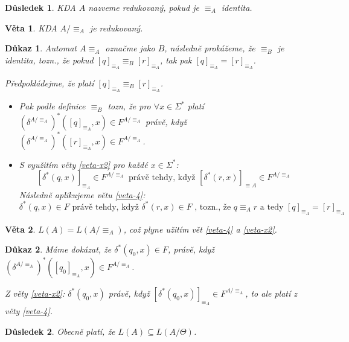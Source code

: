 \documentclass[10pt, a4paper, titlepage]{article}
\theoremstyle{note}
\newtheorem{dukaz}{Důkaz}
\newtheorem{veta}{Věta}
\newtheorem{dusledek}{Důsledek}
\begin{document}
\begin{dusledek}
KDA $A$ nazveme redukovan\'y, pokud je $\equiv_{A}$ identita.
\end{dusledek}

\begin{veta}
KDA $A/ \equiv_{A}$ je redukovaný.
\end{veta}

\begin{dukaz}
Automat $A \equiv_{A}$ označme jako $B$, n\'asledně prok\'ažeme, že $\equiv_{B}$ je identita,
tozn., že pokud $[q]_{\equiv_{A}} \equiv_{B} [r]_{\equiv_{A}}$,
tak pak $[q]_{\equiv_{A}} = [r]_{\equiv_{A}}$.

Předpokl\'adejme, že plat\'i $[q]_{\equiv_{A}} \equiv_{B} [r]_{\equiv_{A}}$.
\begin{itemize}
\item
Pak podle definice $\equiv_{B}$ tozn, že pro $\forall x \in \Sigma^{*}$
plat\'i $(\delta^{A/ \equiv_{A}})^{*} ([q]_{\equiv_{A}},x) \in F^{A/ \equiv_{A}}$ pr\'avě,  když
$(\delta^{A/ \equiv_{A}})^{*}([r]_{\equiv_{A}},x) \in F^{A/ \equiv_{A}}$.

\item
S využit\'im věty \ref{veta-x2} pro každ\'e $x \in \Sigma^{*}$:
$$
[\delta^{*}(q,x)]_{\equiv_{A}} \in F^{A/ \equiv_{A}} \text{ právě tehdy, když } [\delta^{*}(r, x)]_{\equiv{A}} \in F^{A/ \equiv_{A}}
$$
N\'asledně aplikujeme větu \ref{veta-4}:
$$
\delta^{*}(q, x) \in F \text{ pr\'avě tehdy, když } \delta^{*}(r, x) \in F \text{ , tozn., že } q \equiv_{A} r \text{ a tedy } [q]_{\equiv_{A}} = [r]_{\equiv_{A}}
$$
\end{itemize}
\end{dukaz}

\begin{veta}
$L(A) = L(A/ \equiv_{A})$, což plyne užit\'im vět \ref{veta-4} a \ref{veta-x2}.
\end{veta}

\begin{dukaz}
M\'ame dok\'azat, že $\delta^{*}(q_{0}, x) \in F$, pr\'avě, když $(\delta^{A/ \equiv_{A}})^{*}([q_{0}]_{\equiv_{A}}, x) \in F^{A/ \equiv_{A}}$.

Z věty \ref{veta-x2}: $\delta^{*}(q_{0},x)$ pr\'avě, když $[\delta^{*}(q_{0}, x)]_{\equiv_{A}} \in F^{A/ \equiv_{A}}$, to ale plat\'i z věty \ref{veta-4}.
\end{dukaz}

\begin{dusledek}
Obecně plat\'i, že $L(A) \subseteq L(A/ \Theta)$.
\end{dusledek}
\end{document}
